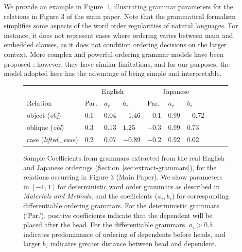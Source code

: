 \documentclass[10pt,twoside,lineno]{article}
\begin{document}
We provide an example in Figure~\ref{fig:grammar-sample}, illustrating grammar parameters for the relations in Figure 3 of the main paper.
Note that the grammatical formalism simplifies some aspects of the word order regularities of natural languages.
For instance, it does not represent cases where ordering varies between main and embedded clauses, as it does not condition ordering decisions on the larger context.
More complex and powerful ordering grammar models have been proposed \cite{futrell2015experiments, wang2016galactic}; however, they have similar limitations, and for our purposes, the model adopted here has the advantage of being simple and interpretable.



\begin{figure}
	\begin{center}
\begin{tabular}{l||l|ll||l|lllll}
	& \multicolumn{3}{c||}{English}    &  \multicolumn{3}{c}{Japanese}  \\ 
	Relation                     &  Par.   & $a_\tau$ & $b_\tau$            & Par.   & $a_\tau$ & $b_\tau$     \\ \hline \hline
	object (\textit{obj})        &  $0.1$   &   $0.04$   & $-1.46$            & $-0.1$  & $0.99$ & $-0.7$2 \\
	oblique (\textit{obl})       &  $0.3$   &   $0.13$     & $1.25$             & $-0.3$  & $0.99$ & $0.73$ \\
	case (\textit{lifted\_case}) &  $0.2$   &   $0.07$       &   $-0.89$         & $-0.2$  &  $0.92$ & $0.02$  \\
\end{tabular}
	\end{center}
	\caption{Sample Coefficients from grammars extracted from the real English and Japanese orderings (Section~\ref{sec:extract-grammars}), for the relations occurring in Figure 3 (Main Paper). We show parameters in $[-1,1]$ for deterministic word order grammars as described in \emph{Materials and Methods}, and the coefficients ($a_\tau, b_\tau$) for corresponding differentiable ordering grammars. For the deterministic grammars (`Par.'), positive coefficients indicate that the dependent will be placed after the head. For the differentiable grammars, $a_\tau > 0.5$ indicates predominance of ordering of dependents before heads, and larger $b_\tau$ indicates greater distance between head and dependent.}\label{fig:grammar-sample}
\end{figure}
\end{document}
